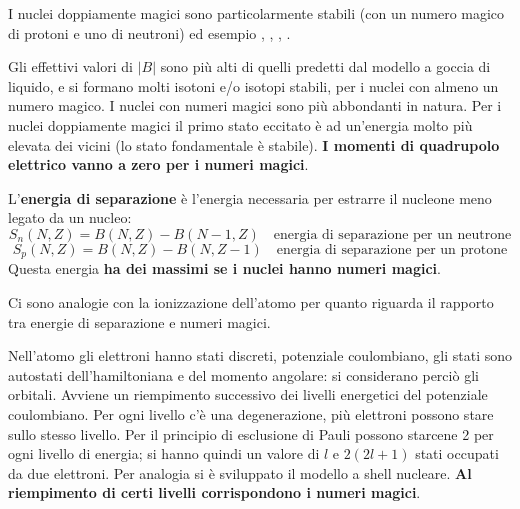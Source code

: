 \documentclass[a4paper,11pt,twoside,openany]{book}
\theoremstyle{definition}
\theoremstyle{plain}
\theoremstyle{plain}
\theoremstyle{definition}
\begin{document}
I nuclei doppiamente magici sono particolarmente stabili (con un numero magico di protoni e uno di neutroni) ed esempio , , , .

Gli effettivi valori di $|B|$ sono più alti di quelli predetti dal modello a goccia di liquido, e si formano molti isotoni e/o isotopi stabili, per i nuclei con almeno un numero magico. I nuclei con numeri magici sono più abbondanti in natura. Per i nuclei doppiamente magici il primo stato eccitato è ad un'energia molto più elevata dei vicini (lo stato fondamentale è stabile). \textbf{I momenti di quadrupolo elettrico vanno a zero per i numeri magici}.

L'\textbf{energia di separazione} è l'energia necessaria per estrarre il nucleone meno legato da un nucleo:
\begin{equation}
S_n(N,Z)=B(N,Z)-B(N-1,Z) \quad \textrm{energia di separazione per un neutrone}
\end{equation}
\begin{equation}
S_p(N,Z)=B(N,Z)-B(N,Z-1) \quad \textrm{energia di separazione per un protone}
\end{equation}
Questa energia \textbf{ha dei massimi se i nuclei hanno numeri magici}.

Ci sono analogie con la ionizzazione dell'atomo per quanto riguarda il rapporto tra energie di separazione e numeri magici.

Nell'atomo gli elettroni hanno stati discreti, potenziale coulombiano, gli stati sono autostati dell'hamiltoniana e del momento angolare: si considerano perciò gli orbitali. Avviene un riempimento successivo dei livelli energetici del potenziale coulombiano. Per ogni livello c'è una degenerazione, più elettroni possono stare sullo stesso livello. Per il principio di esclusione di Pauli possono starcene 2 per ogni livello di energia; si hanno quindi un valore di $l$ e $2(2l+1)$ stati occupati da due elettroni. Per analogia si è sviluppato il modello a shell nucleare. \textbf{Al riempimento di certi livelli corrispondono i numeri magici}.
\end{document}
